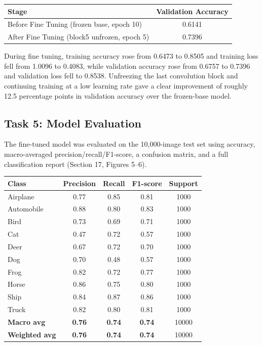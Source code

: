 \documentclass[11pt]{article}
\begin{document}
\begin{center}
\begin{tabular}{|l|c|}
\hline
Stage & Validation Accuracy\\
\hline
Before Fine Tuning (frozen base, epoch 10) & 0.6141\\
After Fine Tuning (block5 unfrozen, epoch 5) & 0.7396\\
\hline
\end{tabular}
\end{center}

During fine tuning, training accuracy rose from 0.6473 to 0.8505 and
training loss fell from 1.0096 to 0.4083, while validation accuracy rose
from 0.6757 to 0.7396 and validation loss fell to 0.8538. Unfreezing the
last convolution block and continuing training at a low learning rate
gave a clear improvement of roughly 12.5 percentage points in validation
accuracy over the frozen-base model.


\subsection*{Task 5: Model Evaluation}

The fine-tuned model was evaluated on the 10,000-image test set using
accuracy, macro-averaged precision/recall/F1-score, a confusion matrix,
and a full classification report (Section 17, Figures 5--6).

\begin{center}
\begin{tabular}{|l|c|c|c|c|}
\hline
Class & Precision & Recall & F1-score & Support\\
\hline
Airplane   & 0.77 & 0.85 & 0.81 & 1000\\
Automobile & 0.88 & 0.80 & 0.83 & 1000\\
Bird       & 0.73 & 0.69 & 0.71 & 1000\\
Cat        & 0.47 & 0.72 & 0.57 & 1000\\
Deer       & 0.67 & 0.72 & 0.70 & 1000\\
Dog        & 0.70 & 0.48 & 0.57 & 1000\\
Frog       & 0.82 & 0.72 & 0.77 & 1000\\
Horse      & 0.86 & 0.75 & 0.80 & 1000\\
Ship       & 0.84 & 0.87 & 0.86 & 1000\\
Truck      & 0.82 & 0.80 & 0.81 & 1000\\
\hline
\textbf{Macro avg} & \textbf{0.76} & \textbf{0.74} & \textbf{0.74} & 10000\\
\textbf{Weighted avg} & \textbf{0.76} & \textbf{0.74} & \textbf{0.74} & 10000\\
\hline
\end{tabular}
\end{center}
\end{document}
